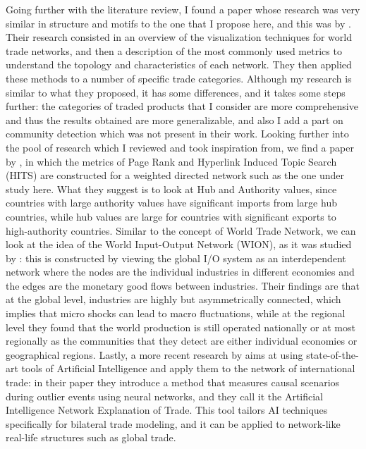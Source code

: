 Going further with the literature review, I found a paper whose research was very similar in structure and motifs to the one that I propose here, and this was by \textcite{benedictis2014bacicepii}. Their research consisted in an overview of the visualization techniques for world trade networks, and then a description of the most commonly used metrics to understand the topology and characteristics of each network. They then applied these methods to a number of specific trade categories. Although my research is similar to what they proposed, it has some differences, and it takes some steps further: the categories of traded products that I consider are more comprehensive and thus the results obtained are more generalizable, and also I add a part on community detection which was not present in their work.
Looking further into the pool of research which I reviewed and took inspiration from, we find a paper by \textcite{deguchi2014hubs}, in which the metrics of Page Rank and Hyperlink Induced Topic Search (HITS) are constructed for a weighted directed network such as the one under study here. What they suggest is to look at Hub and Authority values, since countries with large authority values have significant imports from large hub countries, while hub values are large for countries with significant exports to high-authority countries.
Similar to the concept of World Trade Network, we can look at the idea of the World Input-Output Network (WION), as it was studied by \textcite{cerina2015world}: this is constructed by viewing the global I/O system as an interdependent network where the nodes are the individual industries in different economies and the edges are the monetary good flows between industries. Their findings are that at the global level, industries are highly but asymmetrically connected, which implies that micro shocks can lead to macro fluctuations, while at the regional level they found that the world production is still operated nationally or at most regionally as the communities that they detect are either individual economies or geographical regions.
Lastly, a more recent research by \textcite{monken2021graph} aims at using state-of-the-art tools of Artificial Intelligence and apply them to the network of international trade: in their paper they introduce a method that measures causal scenarios during outlier events using neural networks, and they call it the Artificial Intelligence Network Explanation of Trade. This tool tailors AI techniques specifically for bilateral trade modeling, and it can be applied to network-like real-life structures such as global trade.


